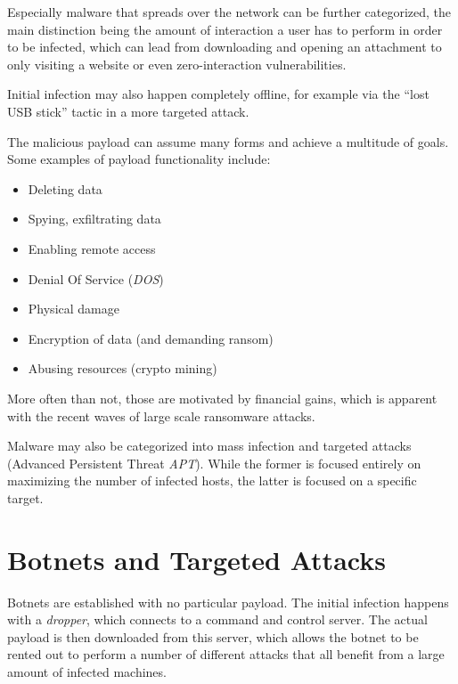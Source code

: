 Especially malware that spreads over the network can be further categorized, the
main distinction being the amount of interaction a user has to perform in order
to be infected, which can lead from downloading and opening an attachment to
only visiting a website or even zero-interaction vulnerabilities.

Initial infection may also happen completely offline, for example via the ``lost
USB stick'' tactic in a more targeted attack.

The malicious payload can assume many forms and achieve a multitude of goals.
Some examples of payload functionality include:
\begin{itemize}
    \item Deleting data
    \item Spying, exfiltrating data
    \item Enabling remote access
    \item Denial Of Service (\textit{DOS})
    \item Physical damage
    \item Encryption of data (and demanding ransom)
    \item Abusing resources (crypto mining)
\end{itemize}

More often than not, those are motivated by financial gains, which is apparent
with the recent waves of large scale ransomware attacks.

Malware may also be categorized into mass infection and targeted attacks
(Advanced Persistent Threat \textit{APT}). While the former is focused entirely
on maximizing the number of infected hosts, the latter is focused on a specific
target.


\section{Botnets and Targeted Attacks}

Botnets are established with no particular payload. The initial infection
happens with a \textit{dropper}, which connects to a command and control server.
The actual payload is then downloaded from this server, which allows the botnet
to be rented out to perform a number of different attacks that all benefit from
a large amount of infected machines.
